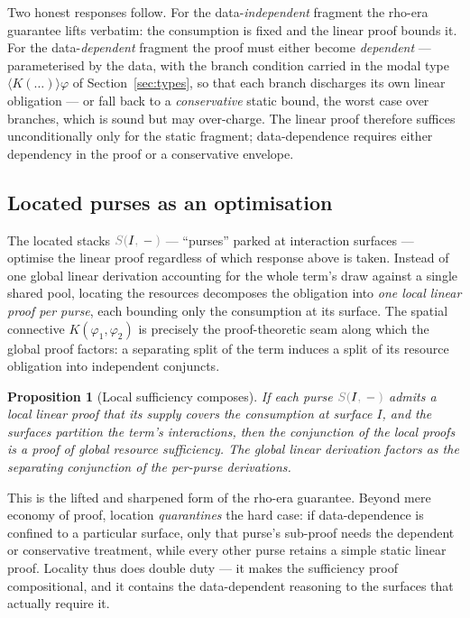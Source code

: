 \documentclass[11pt]{article}
\theoremstyle{definition}
\theoremstyle{plain}
\newtheorem{proposition}[definition]{Proposition}
\newcommand{\dec}[1]{\textcolor{costgray}{#1}}   %
\newcommand{\lstk}[2]{\dec{S(}{#1}\dec{,}\,#2\dec{)}}  %
\newcommand{\dia}[1]{\langle #1 \rangle}  %
\begin{document}
Two honest responses follow. For the data-\emph{independent} fragment the
rho-era guarantee lifts verbatim: the consumption is fixed and the linear
proof bounds it. For the data-\emph{dependent} fragment the proof must
either become \emph{dependent} --- parameterised by the data, with the
branch condition carried in the modal type $\dia{K(\dots)}\varphi$ of
Section~\ref{sec:types}, so that each branch discharges its own linear
obligation --- or fall back to a \emph{conservative} static bound, the
worst case over branches, which is sound but may over-charge. The linear
proof therefore suffices unconditionally only for the static fragment;
data-dependence requires either dependency in the proof or a conservative
envelope.

\subsection{Located purses as an optimisation}

The located stacks $\lstk{I}{-}$ --- ``purses'' parked at interaction
surfaces --- optimise the linear proof regardless of which response above
is taken. Instead of one global linear derivation accounting for the whole
term's draw against a single shared pool, locating the resources
decomposes the obligation into \emph{one local linear proof per purse},
each bounding only the consumption at its surface. The spatial connective
$K(\varphi_1,\varphi_2)$ is precisely the proof-theoretic seam along which
the global proof factors: a separating split of the term induces a split
of its resource obligation into independent conjuncts.

\begin{proposition}[Local sufficiency composes]
\label{prop:local-suff}
If each purse $\lstk{I}{-}$ admits a local linear proof that its supply
covers the consumption at surface $I$, and the surfaces partition the
term's interactions, then the conjunction of the local proofs is a proof
of global resource sufficiency. The global linear derivation factors as
the separating conjunction of the per-purse derivations.
\end{proposition}

This is the lifted and sharpened form of the rho-era guarantee. Beyond
mere economy of proof, location \emph{quarantines} the hard case: if
data-dependence is confined to a particular surface, only that purse's
sub-proof needs the dependent or conservative treatment, while every other
purse retains a simple static linear proof. Locality thus does double
duty --- it makes the sufficiency proof compositional, and it contains the
data-dependent reasoning to the surfaces that actually require it.
\end{document}
